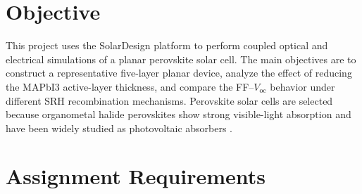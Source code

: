 \documentclass[12pt,a4paper,UTF8]{article}
\begin{document}

\newpage

\pagestyle{fancy}
\fancyhf{}
\renewcommand{\headrulewidth}{0.4pt}
\cfoot{\thepage}

\maketoc

\section{Objective}
This project uses the SolarDesign platform to perform coupled optical and electrical simulations of a planar perovskite solar cell. The main objectives are to construct a representative five-layer planar device, analyze the effect of reducing the MAPbI3 active-layer thickness, and compare the FF--$V_\mathrm{oc}$ behavior under different SRH recombination mechanisms. Perovskite solar cells are selected because organometal halide perovskites show strong visible-light absorption and have been widely studied as photovoltaic absorbers \cite{kojima2009,stranks2013,green2016}.

\section{Assignment Requirements}
\end{document}

